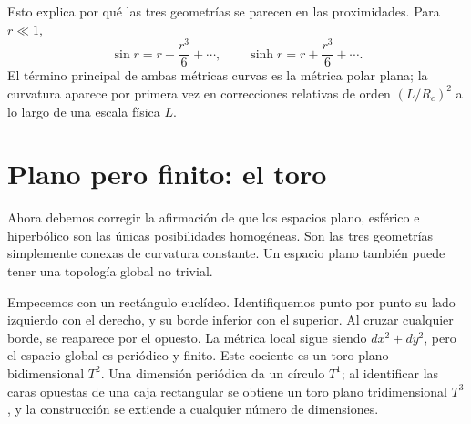 \begin{classroomqa}\end{classroomqa}

Esto explica por qué las tres geometrías se parecen en las proximidades. Para \(r\ll1\),
\begin{equation}
\sin r=r-\frac{r^3}{6}+\cdots,
\qquad
\sinh r=r+\frac{r^3}{6}+\cdots.
\end{equation}
El término principal de ambas métricas curvas es la métrica polar plana; la curvatura aparece por primera vez en correcciones relativas de orden \((L/R_c)^2\) a lo largo de una escala física \(L\).

\begin{classroomqa}\end{classroomqa}

\section{Plano pero finito: el toro}

Ahora debemos corregir la afirmación de que los espacios plano, esférico e hiperbólico son las únicas posibilidades homogéneas. Son las tres geometrías simplemente conexas de curvatura constante. Un espacio plano también puede tener una topología global no trivial.

Empecemos con un rectángulo euclídeo. Identifiquemos punto por punto su lado izquierdo con el derecho, y su borde inferior con el superior. Al cruzar cualquier borde, se reaparece por el opuesto. La métrica local sigue siendo \(dx^2+dy^2\), pero el espacio global es periódico y finito. Este cociente es un toro plano bidimensional \(T^2\). Una dimensión periódica da un círculo \(T^1\); al identificar las caras opuestas de una caja rectangular se obtiene un toro plano tridimensional \(T^3\), y la construcción se extiende a cualquier número de dimensiones.

